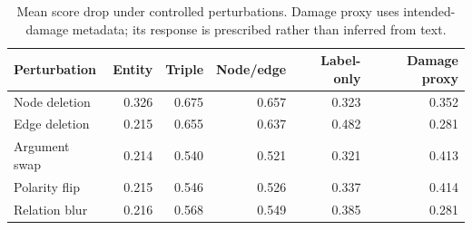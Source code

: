 \begin{table}[t]
\centering
\scriptsize
\caption{Mean score drop under controlled perturbations. Damage proxy uses intended-damage metadata; its response is prescribed rather than inferred from text.}
\label{tab:perturbation-sensitivity-drop}
\begin{tabular}{lrrrrr}
\toprule
Perturbation & Entity & Triple & Node/edge & Label-only & Damage proxy \\
\midrule
Node deletion & 0.326 & 0.675 & 0.657 & 0.323 & 0.352 \\
Edge deletion & 0.215 & 0.655 & 0.637 & 0.482 & 0.281 \\
Argument swap & 0.214 & 0.540 & 0.521 & 0.321 & 0.413 \\
Polarity flip & 0.215 & 0.546 & 0.526 & 0.337 & 0.414 \\
Relation blur & 0.216 & 0.568 & 0.549 & 0.385 & 0.281 \\
\bottomrule
\end{tabular}
\end{table}
